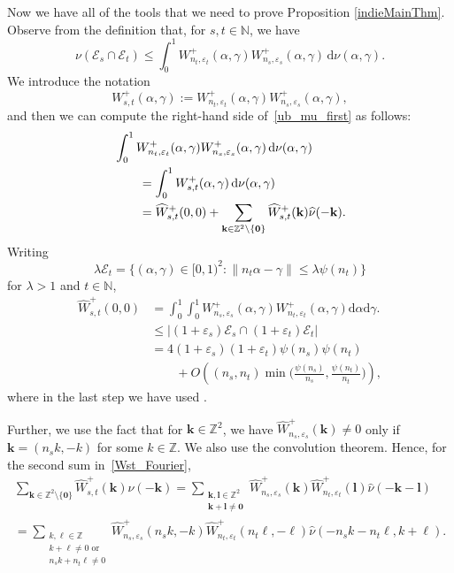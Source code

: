\documentclass[12pt, reqno]{amsart}
\theoremstyle{definition}
\theoremstyle{remark}
\numberwithin{equation}{section}
\def\alp{{\alpha}} \def\bfalp{{\boldsymbol \alpha}}
\def\gam{{\gamma}} \def\Gam{{\Gamma}}
\def\lam{{\lambda}} \def\Lam{{\Lambda}} \def\Lamtil{{\widetilde \Lambda}}
\def\le{\leqslant} \def\ge{\geqslant}
\def\leq{\leqslant}
\def \bN {\mathbb N}
\def \bZ {\mathbb Z}
\def \cE {\mathcal E}
\def \dd {\mathrm d}
\begin{document}
Now we have all of the tools that we need to prove Proposition \ref{indieMainThm}. Observe from the definition that, for $s,t\in\mathbb{N}$, we have
\begin{equation} \label{ub_mu_first}
\nu(\cE_{s}\cap \cE_{t}) \leq \int_{0}^{1} W_{n_t,\varepsilon_t}^+(\alp,\gamma) W_{n_s,\varepsilon_s}^+(\alp,\gamma) \, \mathrm{d}\nu(\alp,\gamma).
\end{equation}
We introduce the notation
\[
W_{s,t}^+(\alp,\gamma):=W_{n_t,\varepsilon_t}^+(\alp,\gamma) W_{n_s,\varepsilon_s}^+(\alp,\gamma),
\]
and then we can compute the right-hand side of~\eqref{ub_mu_first} as follows:
\begin{align} 
\notag
&\int_{0}^{1} W_{n_t,\varepsilon_t}^+(\alp,\gamma) W_{n_s,\varepsilon_s}^+(\alp,\gamma) \, \mathrm{d}\nu(\alp,\gamma)     
\\ \notag & \qquad =
\int_{0}^{1} W_{s,t}^+(\alp,\gamma) \, \mathrm{d}\nu(\alp,\gamma)
\\ 
\label{Wst_Fourier} & \qquad =
\widehat{W}_{s,t}^+(0,0) + \sum_{\mathbf{k}\in\bZ^2\setminus\{\mathbf{0}\}}\widehat{W}^+_{s,t}(\mathbf{k})\widehat{\nu}(-\mathbf{k}).
\end{align}
Writing
\[
\lam \cE_t = \{
(\alp, \gam) \in [0,1)^2:
\| n_t \alp - \gam \| \le \lam \psi(n_t) \}
\]
for $\lam > 1$ and $t \in \bN$,
\begin{equation} \label{main_q_Harman_ub2}
\begin{aligned}
\widehat{W}_{s,t}^+(0,0)
&=\int_0^1\int_0^1 W_{n_s,\varepsilon_s}^+(\alp,\gamma)W_{n_t,\varepsilon_t}^+(\alp,\gamma) \dd \alp \dd \gamma.
\\&\leq\left| (1+\varepsilon_s)\cE_s \cap (1+\varepsilon_t)\cE_t \right|
\\&=
4(1+\varepsilon_s)(1+\varepsilon_t)\psi(n_s)\psi(n_t) 
\\ &\qquad + O\left( (n_s,n_t)\min\Big(\frac{\psi(n_s)}{n_s},\frac{\psi(n_t)}{n_t}\Big)  \right),
\end{aligned}
\end{equation}
where in the last step we have used \cite[Equation~(3.2.5)]{harman}. 

Further, we use the fact that for $\mathbf{k}\in\mathbb{Z}^2$, we have $\widehat{W}_{n_s,\varepsilon_s}^+(\mathbf{k})\neq 0$ only if $\mathbf{k}=(n_s k,-k)$ for some $k\in\bZ$. We also use the convolution theorem. Hence, for the second sum in~\eqref{Wst_Fourier}, 
\begin{multline} \label{Fourier_sum_principal}
\sum_{\mathbf{k}\in\bZ^2\setminus\{\mathbf{0}\}}\widehat{W}^+_{s,t}(\mathbf{k})\widehat{\nu}(-\mathbf{k})
=
\sum_{\substack{\mathbf{k},
	\mathbf{l}\in\bZ^2  \\ \mathbf{k}+\mathbf{l}\ne \mathbf{0}}}\widehat{W}_{n_s,\varepsilon_s}^+(\mathbf{k}) \widehat{W}_{n_t,\varepsilon_t}^+(\mathbf{l})\widehat{\nu}
(-\mathbf{k} - \mathbf{l})
\\ =
\sum_{\substack{k,\ell\in\bZ \\ k+\ell\ne 0\text{ or } \\ n_s k+n_t \ell \ne 0}}\widehat{W}_{n_s,\varepsilon_s}^+(n_s k, -k) \widehat{W}_{n_t,\varepsilon_t}^+(n_t \ell, -\ell)\widehat{\nu}(-n_s k - n_t \ell, k+\ell).
\end{multline}
\end{document}
